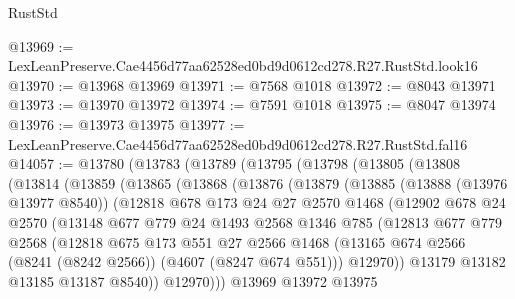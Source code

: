\begin{lexlean}{RustStd}
\begin{coremodule}
@13969 := LexLeanPreserve.Cae4456d77aa62528ed0bd9d0612cd278.R27.RustStd.look16
@13970 := @13968 @13969
@13971 := @7568 @1018
@13972 := @8043 @13971
@13973 := @13970 @13972
@13974 := @7591 @1018
@13975 := @8047 @13974
@13976 := @13973 @13975
@13977 := LexLeanPreserve.Cae4456d77aa62528ed0bd9d0612cd278.R27.RustStd.fal16
@14057 := @13780
    (@13783
      (@13789
        (@13795
          (@13798
            (@13805
              (@13808
                (@13814
                  (@13859
                    (@13865
                      (@13868
                        (@13876
                          (@13879
                            (@13885
                              (@13888 (@13976 @13977 @8540))
                              (@12818
                                @678
                                @173
                                @24
                                @27
                                @2570
                                @1468
                                (@12902
                                  @678
                                  @24
                                  @2570
                                  (@13148
                                    @677
                                    @779
                                    @24
                                    @1493
                                    @2568
                                    @1346
                                    @785
                                    (@12813
                                      @677
                                      @779
                                      @2568
                                      (@12818
                                        @675
                                        @173
                                        @551
                                        @27
                                        @2566
                                        @1468
                                        (@13165
                                          @674
                                          @2566
                                          (@8241 (@8242 @2566))
                                          (@4607 (@8247 @674 @551)))
                                        @12970))
                                    @13179
                                    @13182
                                    @13185
                                    @13187
                                    @8540))
                                @12970)))
                          @13969
                          @13972
                          @13975

\end{coremodule}
\end{lexlean}
